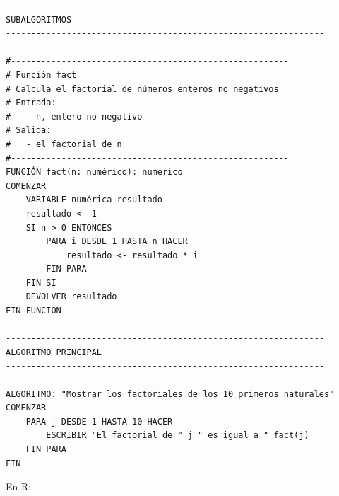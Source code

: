 \documentclass[
]{book}
\begin{document}
\begin{verbatim}
---------------------------------------------------------------
SUBALGORITMOS
---------------------------------------------------------------

#-------------------------------------------------------
# Función fact
# Calcula el factorial de números enteros no negativos
# Entrada:
#   - n, entero no negativo
# Salida:
#   - el factorial de n
#-------------------------------------------------------
FUNCIÓN fact(n: numérico): numérico
COMENZAR
    VARIABLE numérica resultado
    resultado <- 1
    SI n > 0 ENTONCES
        PARA i DESDE 1 HASTA n HACER
            resultado <- resultado * i
        FIN PARA
    FIN SI
    DEVOLVER resultado
FIN FUNCIÓN

---------------------------------------------------------------
ALGORITMO PRINCIPAL
---------------------------------------------------------------

ALGORITMO: "Mostrar los factoriales de los 10 primeros naturales"
COMENZAR
    PARA j DESDE 1 HASTA 10 HACER
        ESCRIBIR "El factorial de " j " es igual a " fact(j)
    FIN PARA
FIN
\end{verbatim}

En R:
\end{document}
